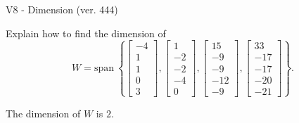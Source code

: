 \begin{exercise}
  \begin{exerciseTitle}V8 - Dimension (ver. 444)\end{exerciseTitle}
  \begin{exerciseStatement}
    Explain how to find the dimension of 
\[W=\mathrm{span}\ \left\{\left[\begin{array}{r}
-4 \\
1 \\
1 \\
0 \\
3
\end{array}\right] , \left[\begin{array}{r}
1 \\
-2 \\
-2 \\
-4 \\
0
\end{array}\right] , \left[\begin{array}{r}
15 \\
-9 \\
-9 \\
-12 \\
-9
\end{array}\right] , \left[\begin{array}{r}
33 \\
-17 \\
-17 \\
-20 \\
-21
\end{array}\right]\right\}.\]



  \end{exerciseStatement}
  \begin{exerciseAnswer}
   The dimension of \(W\) is  \(2\).
  


  \end{exerciseAnswer}
\end{exercise}
